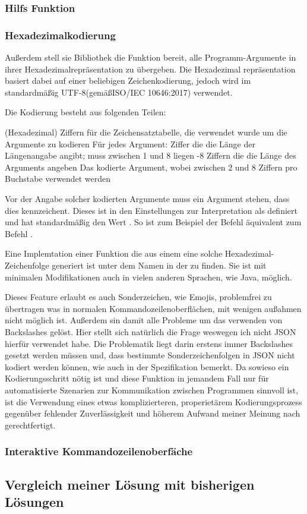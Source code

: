 \subsubsection{Hilfs Funktion}
\subsubsection{Hexadezimalkodierung}\label{Hexadecimalencoding}
Au\ss erdem stell sie Bibliothek die Funktion bereit, alle Programm-Argumente in ihrer Hexadezimalrepräsentation zu übergeben.
Die Hexadezimal repräsentation basiert dabei auf einer beliebigen Zeichenkodierung, jedoch wird im standardmä\ss ig UTF-8(gemä\ss ISO/IEC 10646:2017) verwendet.

Die Kodierung besteht aus folgenden Teilen:
\begin{outline}
  (Hexadezimal) Ziffern für die Zeichensatztabelle, die verwendet wurde um die Argumente zu kodieren
 \1 Für jedes Argument:
   Ziffer die die Länge der Längenangabe angibt;
  muss zwischen 1 und 8 liegen 
  -8 Ziffern die die Länge des Arguments angeben
  \2 Das kodierte Argument, wobei zwischen 2 und 8 Ziffern pro Buchstabe verwendet werden
\end{outline}

Vor der Angabe solcher kodierten Argumente muss ein Argument stehen, dass dies kennzeichent.
Dieses ist in den Einstellungen zur Interpretation als  definiert und hat standardmä\ss ig den Wert .
So ist zum Beispiel der Befehl  äquivalent zum Befehl .

Eine Implemtation einer Funktion die aus einem  eine solche Hexadezimal-Zeichenfolge generiert ist unter dem Namen  in der  zu finden.
Sie ist mit minimalen Modifikationen auch in vielen anderen Sprachen, wie Java, möglich.

Dieses Feature erlaubt es auch Sonderzeichen, wie Emojis, problemfrei zu übertragen was in normalen Kommandozeilenoberfl\"achen, mit wenigen au\ss ahmen nicht m\"oglich ist.
Au\ss erdem sin damit alle Probleme um das verwenden von Backslashes gelöst.
Hier stellt sich natürlich die Frage weswegen ich nicht JSON hierfür verwendet habe.
Die Problematik liegt darin erstens immer Backslashes gesetzt werden müssen und, dass bestimmte Sonderzeichenfolgen in JSON nicht kodiert werden können, wie auch in der Spezifikation bemerkt\cite{JSONSpec}.
Da sowieso ein Kodierungsschritt nötig ist und diese Funktion in jemandem Fall nur für automatisierte Szenarien zur Kommunikation zwischen Programmen sinnvoll ist,
ist die Verwendung eines etwas komplizierteren, properiet\"arem Kodierungsprozess gegenüber fehlender Zuverlässigkeit und höherem Aufwand meiner Meinung nach gerechtfertigt.
\subsubsection{Interaktive Kommandozeilenoberfäche}

\subsection{Vergleich meiner Lösung mit bisherigen Lösungen}\label{subsec:Comparison}